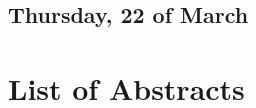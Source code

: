\documentclass[
	openany, %
	parskip=false, %
	12pt, %
	a4paper, %
]{conferencebooklet} %
\begin{document}

\section{Thursday, 22 of March}




\chapter{List of Abstracts}









\end{document}
